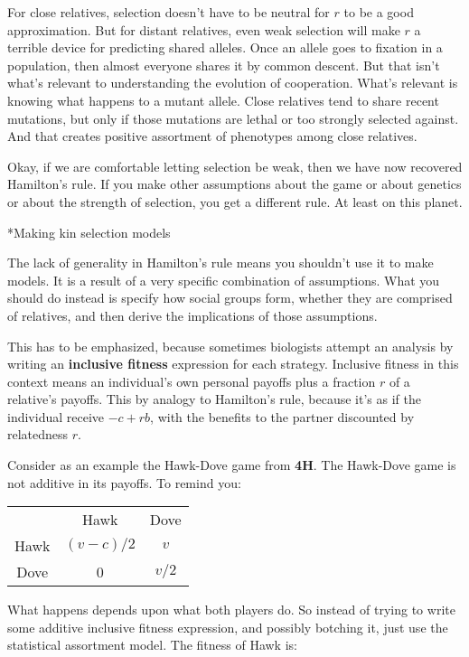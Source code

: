 \documentclass[10pt,reqno]{amsbook}
\makeatletter
\newcommand{\bemph}[1]{{\textbf{\textcolor{bemphcol}{#1}}}}
\renewcommand\section{\@startsection{section}{1}
\z@{.7\linespacing\@plus\linespacing}{.5\linespacing}
{\large\bfseries\itshape}}
\numberwithin{equation}{chapter}
\makeatother
\begin{document}
For close relatives, selection doesn't have to be neutral for $r$ to be a good approximation. But for distant relatives, even weak selection will make $r$ a terrible device for predicting shared alleles. Once an allele goes to fixation in a population, then almost everyone shares it by common descent. But that isn't what's relevant to understanding the evolution of cooperation. What's relevant is knowing what happens to a mutant allele. Close relatives tend to share recent mutations, but only if those mutations are lethal or too strongly selected against. And that creates positive assortment of phenotypes among close relatives. 

Okay, if we are comfortable letting selection be weak, then we have now recovered Hamilton's rule. If you make other assumptions about the game or about genetics or about the strength of selection, you get a different rule. At least on this planet.

\section*{Making kin selection models}

The lack of generality in Hamilton's rule means you shouldn't use it to make models. It is a result of a very specific combination of assumptions. What you should do instead is specify how social groups form, whether they are comprised of relatives, and then derive the implications of those assumptions. 

This has to be emphasized, because sometimes biologists attempt an analysis by writing an \bemph{inclusive fitness} expression for each strategy. Inclusive fitness in this context means an individual's own personal payoffs plus a fraction $r$ of a relative's payoffs. This by analogy to Hamilton's rule, because it's as if the individual receive $-c + rb$, with the benefits to the partner discounted by relatedness $r$.

Consider as an example the Hawk-Dove game from \bemph{4H}. The Hawk-Dove game is not additive in its payoffs. To remind you:
\begin{center}
	\begin{tabular}{ccc}
		& Hawk & Dove \\
	  Hawk & $(v-c)/2$ & $v$ \\
	  Dove & 0 & $v/2$
	\end{tabular}
\end{center}
What happens depends upon what both players do. So instead of trying to write some additive inclusive fitness expression, and possibly botching it, just use the statistical assortment model. The fitness of Hawk is:
\end{document}
